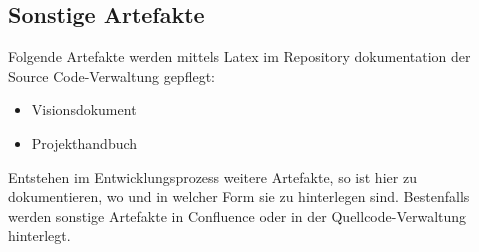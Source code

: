 \subsection{Sonstige Artefakte}
Folgende Artefakte werden mittels Latex im Repository dokumentation der Source Code-Verwaltung gepflegt:
\begin{itemize}
	\item Visionsdokument
	\item Projekthandbuch
\end{itemize}
Entstehen im Entwicklungsprozess weitere Artefakte, so ist hier zu dokumentieren, wo und in welcher Form sie zu hinterlegen sind. Bestenfalls werden sonstige Artefakte in Confluence oder in der Quellcode-Verwaltung hinterlegt.
